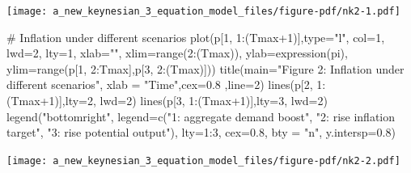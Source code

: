 \documentclass[
  letterpaper,
  DIV=11,
  numbers=noendperiod]{scrreprt}
\newenvironment{Shaded}{\begin{snugshade}}{\end{snugshade}}
\newcommand{\AttributeTok}[1]{\textcolor[rgb]{0.40,0.45,0.13}{#1}}
\newcommand{\CommentTok}[1]{\textcolor[rgb]{0.37,0.37,0.37}{#1}}
\newcommand{\DecValTok}[1]{\textcolor[rgb]{0.68,0.00,0.00}{#1}}
\newcommand{\FloatTok}[1]{\textcolor[rgb]{0.68,0.00,0.00}{#1}}
\newcommand{\FunctionTok}[1]{\textcolor[rgb]{0.28,0.35,0.67}{#1}}
\newcommand{\NormalTok}[1]{\textcolor[rgb]{0.00,0.23,0.31}{#1}}
\newcommand{\SpecialCharTok}[1]{\textcolor[rgb]{0.37,0.37,0.37}{#1}}
\newcommand{\StringTok}[1]{\textcolor[rgb]{0.13,0.47,0.30}{#1}}
\begin{document}
\texttt{[image: a\_new\_keynesian\_3\_equation\_model\_files/figure-pdf/nk2-1.pdf]}

\begin{Shaded}
\begin{Highlighting}[]
\CommentTok{\# Inflation under different scenarios}
\FunctionTok{plot}\NormalTok{(p[}\DecValTok{1}\NormalTok{, }\DecValTok{1}\SpecialCharTok{:}\NormalTok{(Tmax}\SpecialCharTok{+}\DecValTok{1}\NormalTok{)],}\AttributeTok{type=}\StringTok{"l"}\NormalTok{, }\AttributeTok{col=}\DecValTok{1}\NormalTok{, }\AttributeTok{lwd=}\DecValTok{2}\NormalTok{, }\AttributeTok{lty=}\DecValTok{1}\NormalTok{, }\AttributeTok{xlab=}\StringTok{""}\NormalTok{, }\AttributeTok{xlim=}\FunctionTok{range}\NormalTok{(}\DecValTok{2}\SpecialCharTok{:}\NormalTok{(Tmax)), }\AttributeTok{ylab=}\FunctionTok{expression}\NormalTok{(pi), }\AttributeTok{ylim=}\FunctionTok{range}\NormalTok{(p[}\DecValTok{1}\NormalTok{, }\DecValTok{2}\SpecialCharTok{:}\NormalTok{Tmax],p[}\DecValTok{3}\NormalTok{, }\DecValTok{2}\SpecialCharTok{:}\NormalTok{(Tmax)])) }
\FunctionTok{title}\NormalTok{(}\AttributeTok{main=}\StringTok{"Figure 2: Inflation under different scenarios"}\NormalTok{, }\AttributeTok{xlab =} \StringTok{"Time"}\NormalTok{,}\AttributeTok{cex=}\FloatTok{0.8}\NormalTok{ ,}\AttributeTok{line=}\DecValTok{2}\NormalTok{)}
\FunctionTok{lines}\NormalTok{(p[}\DecValTok{2}\NormalTok{, }\DecValTok{1}\SpecialCharTok{:}\NormalTok{(Tmax}\SpecialCharTok{+}\DecValTok{1}\NormalTok{)],}\AttributeTok{lty=}\DecValTok{2}\NormalTok{, }\AttributeTok{lwd=}\DecValTok{2}\NormalTok{)}
\FunctionTok{lines}\NormalTok{(p[}\DecValTok{3}\NormalTok{, }\DecValTok{1}\SpecialCharTok{:}\NormalTok{(Tmax}\SpecialCharTok{+}\DecValTok{1}\NormalTok{)],}\AttributeTok{lty=}\DecValTok{3}\NormalTok{, }\AttributeTok{lwd=}\DecValTok{2}\NormalTok{)}
\FunctionTok{legend}\NormalTok{(}\StringTok{"bottomright"}\NormalTok{, }\AttributeTok{legend=}\FunctionTok{c}\NormalTok{(}\StringTok{"1: aggregate demand boost"}\NormalTok{, }\StringTok{"2: rise inflation target"}\NormalTok{, }\StringTok{"3: rise potential output"}\NormalTok{), }\AttributeTok{lty=}\DecValTok{1}\SpecialCharTok{:}\DecValTok{3}\NormalTok{, }\AttributeTok{cex=}\FloatTok{0.8}\NormalTok{, }\AttributeTok{bty =} \StringTok{"n"}\NormalTok{, }\AttributeTok{y.intersp=}\FloatTok{0.8}\NormalTok{)}
\end{Highlighting}
\end{Shaded}

\texttt{[image: a\_new\_keynesian\_3\_equation\_model\_files/figure-pdf/nk2-2.pdf]}
\end{document}
